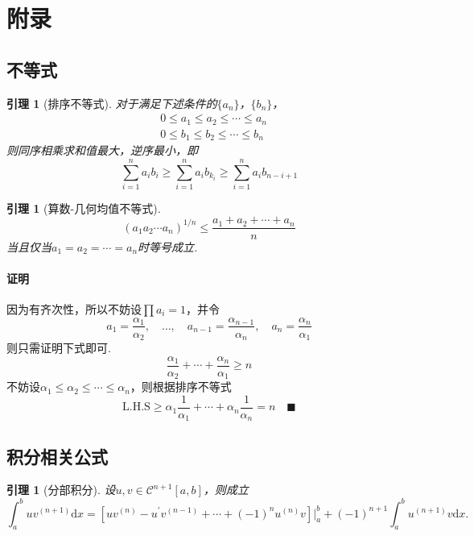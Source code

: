 \documentclass[12pt, a4paper]{article}
\theoremstyle{margin}
\newtheorem{lemma}[thm]{引理}
\newcommand{\hp}{^\prime}
\newcommand{\ms}{\mathscr}
\newcommand{\rd}{\mathrm{d}}
\newcommand{\lhs}{\text{L.H.S}}
\newcommand{\proof}{\paragraph{证明}}
\begin{document}
\fi
\newpage
\section{附录}
\subsection{不等式}

  \begin{lemma}[排序不等式]
    \label{lemma: 排序不等式}
    对于满足下述条件的$\{a_n\}$，$\{b_n\}$，
    \[\begin{split}
      & 0 \le a_1\le a_2\le\cdots\le a_n \\
      & 0 \le b_1\le b_2\le\cdots\le b_n
    \end{split}\]
    则同序相乘求和值最大，逆序最小，即
    \[
      \sum_{i=1}^n a_ib_i \ge \sum_{i=1}^n a_ib_{k_i}
      \ge \sum_{i=1}^n a_ib_{n-i+1}
    \]
  \end{lemma}

  \begin{lemma}[算数-几何均值不等式]
    \[
      (a_1a_2\cdots a_n)^{1/n} \le \frac{a_1+a_2+\cdots+a_n}{n}
    \]
    当且仅当$a_1 = a_2 = \cdots = a_n$时等号成立.
  \end{lemma}
  \proof
    因为有齐次性，所以不妨设$\prod a_i=1$，并令
    \[
      a_1=\frac{\alpha_1}{\alpha_2},\quad
      \dots,\quad
      a_{n-1} = \frac{\alpha_{n-1}}{\alpha_n},\quad
      a_n = \frac{\alpha_n}{\alpha_1}
    \]
    则只需证明下式即可.
    \[
      \frac{\alpha_1}{\alpha_2} + \cdots + \frac{\alpha_n}{\alpha_1}
      \ge n
    \]
    不妨设$\alpha_1 \le \alpha_2 \le \cdots \le \alpha_n$，则根据排序不等式
    \[
      \lhs \ge \alpha_1\frac{1}{\alpha_1} + \cdots + \alpha_n\frac{1}{\alpha_n}
       = n \quad\blacksquare
    \]

\newpage
\subsection{积分相关公式}
  \begin{lemma}[分部积分]
    设$u,v\in\ms{C}^{n+1}[a, b]$，则成立
    \[
      \int_a^buv^{(n+1)}\rd x =
      [ uv^{(n)} - u\hp v^{(n-1)} + \cdots +  (-1)^nu^{(n)}v]
      \bigg\vert_a^b + (-1)^{n+1}\int_a^bu^{(n+1)}v\rd x.
    \]
  \end{lemma}
\end{document}
